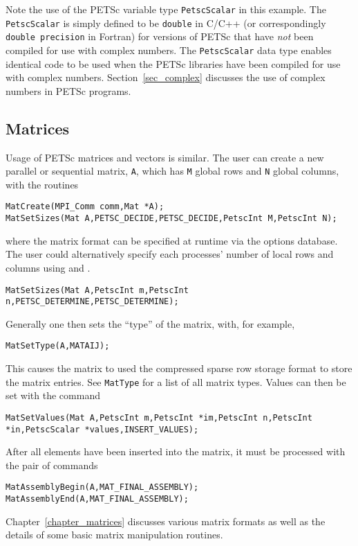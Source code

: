 {{
Note the use of the PETSc variable type \lstinline{PetscScalar} in this example.
The \lstinline{PetscScalar} is simply defined to be \lstinline{double} in C/C++
(or correspondingly \lstinline{double precision} in Fortran) for versions of
PETSc that have {\em not} been compiled for use with complex numbers.
The \lstinline{PetscScalar} data type enables
identical code to be used when the PETSc libraries have been compiled
for use with complex numbers.  Section~\ref{sec_complex} discusses the
use of complex numbers in PETSc programs.

\subsection*{Matrices}
\label{sec_matintro}
Usage of PETSc matrices and vectors is similar. 
The user can create a new parallel or sequential matrix, \lstinline{A}, which
has \lstinline{M} global rows and \lstinline{N} global columns, with the routines
\begin{lstlisting}
MatCreate(MPI_Comm comm,Mat *A);
MatSetSizes(Mat A,PETSC_DECIDE,PETSC_DECIDE,PetscInt M,PetscInt N);
\end{lstlisting}
where the matrix format can be specified at runtime via the options database.  The user could
alternatively specify each processes' number of local rows and columns
using  and .
\begin{lstlisting}
MatSetSizes(Mat A,PetscInt m,PetscInt n,PETSC_DETERMINE,PETSC_DETERMINE);
\end{lstlisting}
Generally one then sets the ``type'' of the matrix, with, for example,
\begin{lstlisting}
MatSetType(A,MATAIJ);
\end{lstlisting}
This causes the matrix  to used the compressed sparse row storage format to store the
matrix entries. See \lstinline{MatType} for a list of all matrix types.
Values can then be set with the command
\begin{lstlisting}
MatSetValues(Mat A,PetscInt m,PetscInt *im,PetscInt n,PetscInt *in,PetscScalar *values,INSERT_VALUES);
\end{lstlisting}
After all elements have been inserted into the
matrix, it must be processed with the pair of commands
\begin{lstlisting}
MatAssemblyBegin(A,MAT_FINAL_ASSEMBLY);
MatAssemblyEnd(A,MAT_FINAL_ASSEMBLY);
\end{lstlisting}
Chapter~\ref{chapter_matrices} discusses various matrix formats as
well as the details of some basic matrix manipulation routines.

}}
